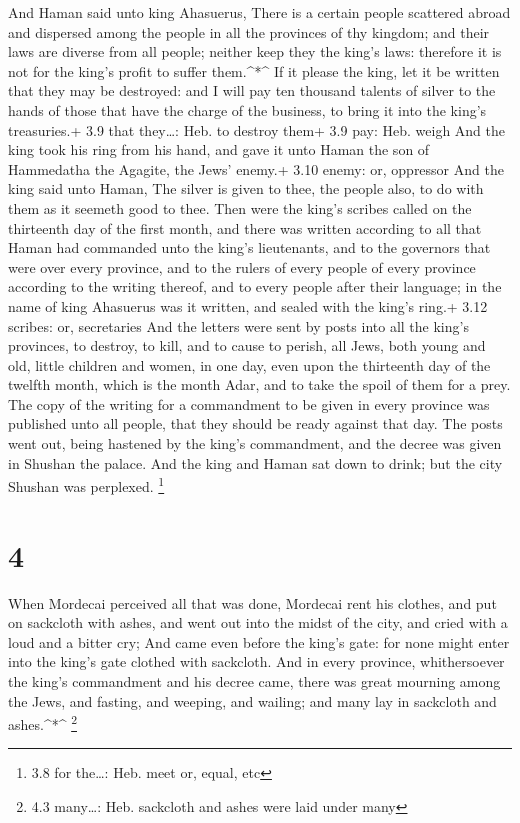  And Haman said unto king Ahasuerus, There is a certain
people scattered abroad and dispersed among the people in all the
provinces of thy kingdom; and their laws are diverse from all people;
neither keep they the king's laws: therefore it is not for the king's
profit to suffer them.\^{}*\^{}  If it please the king, let
it be written that they may be destroyed: and I will pay ten thousand
talents of silver to the hands of those that have the charge of the
business, to bring it into the king's treasuries.+ 3.9 that they\ldots:
Heb. to destroy them+ 3.9 pay: Heb. weigh  And the king
took his ring from his hand, and gave it unto Haman the son of
Hammedatha the Agagite, the Jews' enemy.+ 3.10 enemy: or, oppressor
 And the king said unto Haman, The silver is given to thee,
the people also, to do with them as it seemeth good to thee.
 Then were the king's scribes called on the thirteenth day
of the first month, and there was written according to all that Haman
had commanded unto the king's lieutenants, and to the governors that
were over every province, and to the rulers of every people of every
province according to the writing thereof, and to every people after
their language; in the name of king Ahasuerus was it written, and sealed
with the king's ring.+ 3.12 scribes: or, secretaries  And
the letters were sent by posts into all the king's provinces, to
destroy, to kill, and to cause to perish, all Jews, both young and old,
little children and women, in one day, even upon the thirteenth day of
the twelfth month, which is the month Adar, and to take the spoil of
them for a prey.  The copy of the writing for a commandment
to be given in every province was published unto all people, that they
should be ready against that day.  The posts went out,
being hastened by the king's commandment, and the decree was given in
Shushan the palace. And the king and Haman sat down to drink; but the
city Shushan was perplexed. \footnote{3.8 for the\ldots: Heb. meet or,
  equal, etc}

\hypertarget{section-3}{%
\section{4}\label{section-3}}

 When Mordecai perceived all that was done, Mordecai rent
his clothes, and put on sackcloth with ashes, and went out into the
midst of the city, and cried with a loud and a bitter cry; 
And came even before the king's gate: for none might enter into the
king's gate clothed with sackcloth.  And in every province,
whithersoever the king's commandment and his decree came, there was
great mourning among the Jews, and fasting, and weeping, and wailing;
and many lay in sackcloth and ashes.\^{}*\^{} \footnote{4.3 many\ldots:
  Heb. sackcloth and ashes were laid under many}

